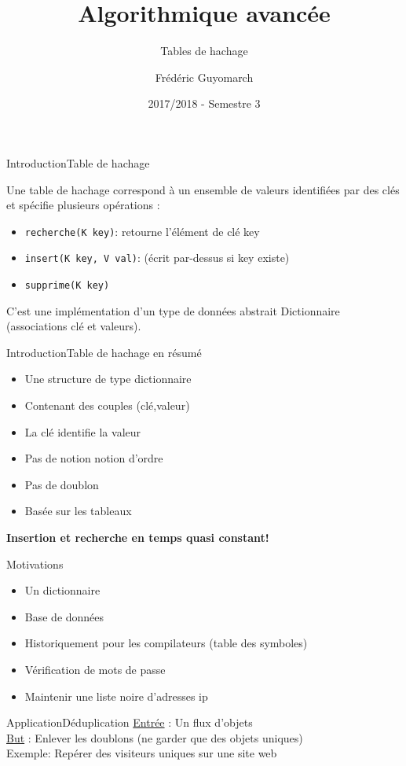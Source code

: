 \documentclass[12pt,a4paper]{beamer}
\title{\textbf{Algorithmique avancée}}
\subtitle{Tables de hachage}
\author{Frédéric Guyomarch}
\date{2017/2018 - Semestre 3}
\institute %
{

  Université de Lille1\\
  IUT-A de Lille

}
\newcommand{\hl}[1]{\textcolor{blueemph}{#1}}
\begin{document}
\begin{frame}
\titlepage
\end{frame}

\begin{frame}{Introduction}{Table de hachage}

Une table de hachage correspond à un ensemble de valeurs identifiées par des clés et spécifie plusieurs opérations : 
\begin{itemize}
\item \texttt{recherche(K key)}: retourne l'élément de clé key
\item \texttt{insert(K key, V val)}: (écrit par-dessus si key existe) 
\item \texttt{supprime(K key)}
\end{itemize}
C'est une implémentation d'un type de données abstrait Dictionnaire (associations clé et valeurs).
\end{frame}


\begin{frame}{Introduction}{Table de hachage en résumé}

\begin{itemize}
\item Une structure de type dictionnaire
\item Contenant des couples (clé,valeur)
\item La clé identifie la valeur 
\item Pas de notion notion d'ordre
\item Pas de doublon
\item Basée sur les tableaux
\end{itemize}
\pause 
 \hl{\textbf{\Smiley Insertion et recherche en temps quasi constant!}}
\end{frame}


\begin{frame}{Motivations}{}

\begin{itemize}
\item Un dictionnaire
\item Base de données
\item Historiquement pour les compilateurs (table des symboles)
\item Vérification de mots de passe
\item Maintenir une liste noire d'adresses ip
\end{itemize}

\end{frame}

\begin{frame}[t]{Application}{Déduplication}
\underline{Entrée} : Un flux d'objets\\
\underline{But} : Enlever les doublons (ne garder que des objets uniques)\\
Exemple: Repérer des visiteurs uniques sur une site web
\end{frame}
\end{document}
